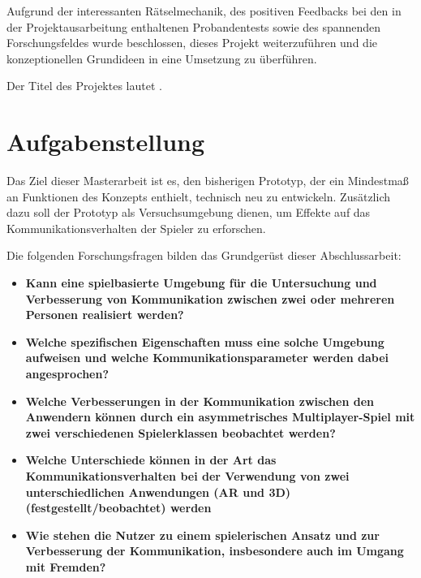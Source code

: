 Aufgrund der interessanten Rätselmechanik, des positiven Feedbacks bei den in der Projektausarbeitung enthaltenen Probandentests sowie des spannenden Forschungsfeldes wurde beschlossen, dieses Projekt weiterzuführen und die konzeptionellen Grundideen in eine Umsetzung zu überführen.

Der Titel des Projektes lautet .

\section{Aufgabenstellung}
Das Ziel dieser Masterarbeit ist es, den bisherigen Prototyp, der ein Mindestmaß an Funktionen des Konzepts enthielt, technisch neu zu entwickeln. Zusätzlich dazu soll der Prototyp als Versuchsumgebung dienen, um Effekte auf das Kommunikationsverhalten der Spieler zu erforschen. 

Die folgenden Forschungsfragen bilden das Grundgerüst dieser Abschlussarbeit:


\begin{itemize}
    \item \textbf{Kann eine spielbasierte Umgebung für die Untersuchung und Verbesserung von Kommunikation zwischen zwei oder mehreren Personen realisiert werden?}
    \item \textbf{Welche spezifischen Eigenschaften muss eine solche Umgebung aufweisen und welche Kommunikationsparameter werden dabei angesprochen?}
    \item \textbf{Welche Verbesserungen in der Kommunikation zwischen den Anwendern können durch ein asymmetrisches Multiplayer-Spiel mit zwei verschiedenen Spielerklassen beobachtet werden?}
    \item \textbf{Welche Unterschiede können in der Art das Kommunikationsverhalten bei der Verwendung von zwei unterschiedlichen Anwendungen (AR und 3D) (festgestellt/beobachtet) werden}
    \item \textbf{Wie stehen die Nutzer zu einem spielerischen Ansatz und zur Verbesserung der Kommunikation, insbesondere auch im Umgang mit Fremden?}
\end{itemize}

